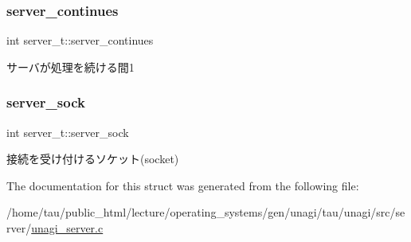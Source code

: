 \subsubsection{\texorpdfstring{server\+\_\+continues}{server\_continues}}
{\footnotesize\ttfamily int server\+\_\+t\+::server\+\_\+continues}

サーバが処理を続ける間1 \mbox{\label{structserver__t_aa00bd4dd0cc9961993afa944f953b321}} 
\subsubsection{\texorpdfstring{server\+\_\+sock}{server\_sock}}
{\footnotesize\ttfamily int server\+\_\+t\+::server\+\_\+sock}

接続を受け付けるソケット(socket) 

The documentation for this struct was generated from the following file\+:\begin{DoxyCompactItemize}
\item 
/home/tau/public\+\_\+html/lecture/operating\+\_\+systems/gen/unagi/tau/unagi/src/server/\hyperlink{unagi__server_8c}{unagi\+\_\+server.\+c}\end{DoxyCompactItemize}
